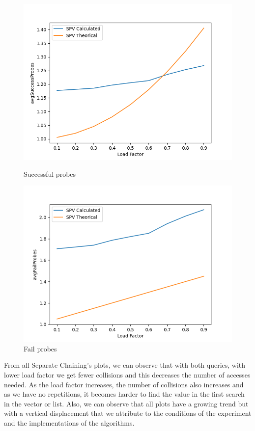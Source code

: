 \documentclass{article}
\begin{document}
        \begin{figure}[H]
          \includegraphics[width=\linewidth]{images/loadFactor_vs_avgSuccessProbes_SPV.png}
          \caption{Successful probes}\label{fig:plot14}
        \endminipage\hfill
          \includegraphics[width=\linewidth]{images/loadFactor_vs_avgFailProbes_SPV.png}
          \caption{Fail probes}\label{fig:plot15}
        \endminipage
    \end{figure}
    
    From all Separate Chaining's plots, we can observe that with both queries, with lower load factor we get fewer collisions and this decreases the number of accesses needed. As the load factor increases, the number of collisions also increases and as we have no repetitions, it becomes harder to find the value in the first search in the vector or list. Also, we can observe that all plots have a growing trend but with a vertical displacement that we attribute to the conditions of the experiment and the implementations of the algorithms.
    
\end{document}
